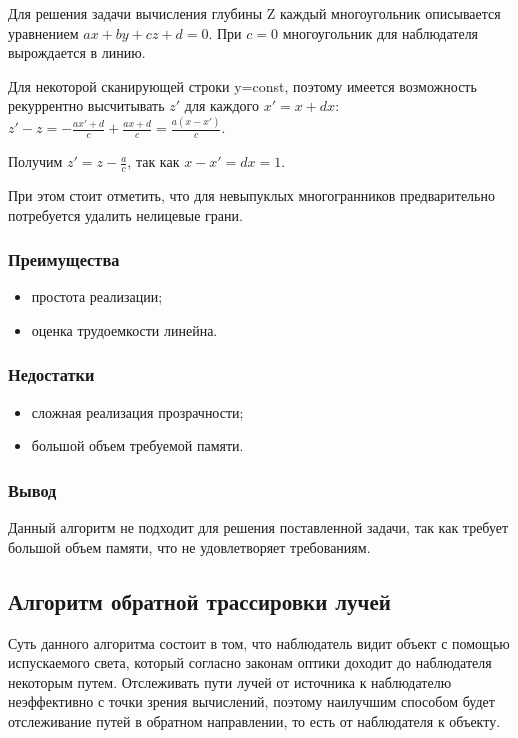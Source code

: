 Для решения задачи вычисления глубины Z каждый многоугольник описывается уравнением $ax+by+cz+d=0$. При $c=0$ многоугольник для наблюдателя вырождается в линию. 

Для некоторой сканирующей строки y=const, поэтому имеется возможность рекуррентно высчитывать $z'$ для каждого $x'=x+dx$: $z' - z = - \frac{ax' + d}{c} + \frac{ax + d}{c} = \frac{a(x - x')}{c}$.

Получим $z' = z - \frac{a}{c}$, так как $x - x' = dx = 1$.

При этом стоит отметить, что для невыпуклых многогранников предварительно потребуется удалить нелицевые грани.

\subsubsection*{Преимущества}
\begin{itemize}
	\item простота реализации;
	\item оценка трудоемкости линейна.
\end{itemize}
\subsubsection*{Недостатки}
\begin{itemize}
	\item сложная реализация прозрачности;
	\item большой объем требуемой памяти.
\end{itemize}
\subsubsection*{Вывод}
Данный алгоритм не подходит для решения поставленной задачи, так как требует большой объем памяти, что не удовлетворяет требованиям. 

\subsection*{Алгоритм обратной трассировки лучей}

Суть данного алгоритма состоит в том, что наблюдатель видит объект с помощью испускаемого света, который согласно законам оптики доходит до наблюдателя некоторым путем. Отслеживать пути лучей от источника к наблюдателю неэффективно с точки зрения вычислений, поэтому наилучшим способом будет отслеживание путей в обратном направлении, то есть от наблюдателя к объекту.


